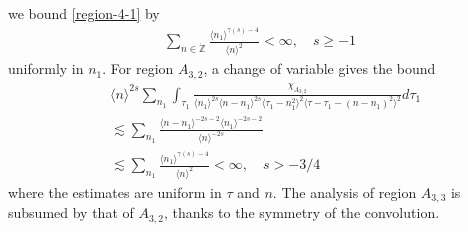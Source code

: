 \documentclass[12pt,reqno]{amsart}
\numberwithin{equation}{section}  %
\newcommand{\zz}{\mathbb{Z}}
\newcommand{\zzdot}{\dot{\zz}}
\begin{document}
  we bound \eqref{region-4-1} by
  \begin{equation*}
  \begin{split}
    \sum_{n \in \zzdot} \frac{\langle n_{1}\rangle ^{\gamma(s)-4}}{\langle n \rangle^{2}} < \infty, \quad s \ge -1
  \end{split}
  \end{equation*}
  uniformly in $n_{1}$.
  For region $A_{3,2}$, a change of variable gives the bound 
\begin{equation}
  \begin{split}
    & \langle n
    \rangle ^{2s}
    \sum_{n_{1}} \int_{\tau_{1}} \frac{\chi_{A_{3,2}}}{\langle n_{1} \rangle ^{2s} \langle n-n_{1} \rangle ^{2s} 
    \langle \tau_{1} - n_{1}^{2} \rangle^{2} \langle  \tau - \tau_{1} - (n - n_{1})^{2} \rangle^{2}}
    d \tau_1 
    \\
    & \lesssim \sum_{n_{1}} \frac{\langle n - n_{1} \rangle ^{-2s-2} \langle n_{1} \rangle ^{-2s-2}}{\langle
    n\rangle ^{-2s}}  
    \\
    & \lesssim \sum_{n_{1}} \frac{\langle n_{1}\rangle ^{\gamma(s)-4}}{\langle n \rangle^{2}} < \infty, \quad s > -3/4
  \end{split}
\end{equation}
where the estimates are uniform in $\tau$ and $n$. The analysis of region $A_{3,3}$ is subsumed by that of $A_{3,2}$, thanks to the symmetry of the convolution.
%
\end{document}
